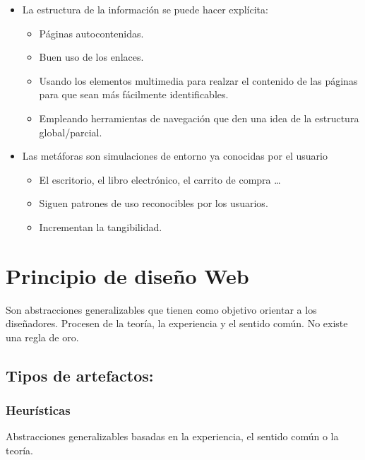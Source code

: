 \documentclass[12pt, twoside, openright]{report} %
\begin{document}
\begin{itemize}
      \begin{itemize}
      
      \item
        La estructura de la información se puede hacer explícita:

        \begin{itemize}
        
        \item
          Páginas autocontenidas.
        \item
          Buen uso de los enlaces.
        \item
          Usando los elementos multimedia para realzar el contenido de
          las páginas para que sean más fácilmente identificables.
        \item
          Empleando herramientas de navegación que den una idea de la
          estructura global/parcial.
        \end{itemize}
      \item
        Las metáforas son simulaciones de entorno ya conocidas por el
        usuario
      
        \begin{itemize}
          \item
          El escritorio, el libro electrónico, el carrito de
          compra \ldots{}
  
        \item
          Siguen patrones de uso reconocibles por los usuarios.

          \item
        Incrementan la tangibilidad.
        \end{itemize}
      
      \end{itemize}
    \end{itemize}
\pagebreak
\section{Principio de diseño Web}


    Son abstracciones generalizables que tienen como objetivo orientar a
    los diseñadores. Procesen de la teoría, la experiencia y el sentido
    común. No existe una regla de oro.

\subsection{Tipos de artefactos:}

\subsubsection{Heurísticas}
	  Abstracciones generalizables basadas en la
      experiencia, el sentido común o la teoría.
\end{document}
